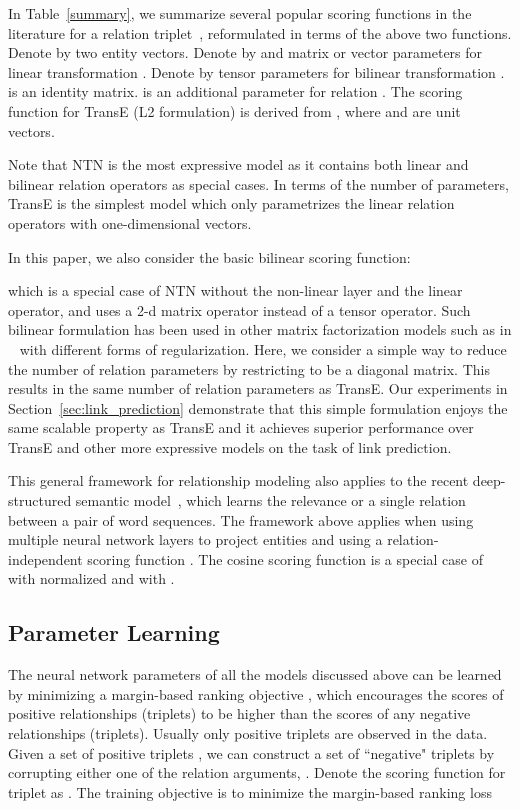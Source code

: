 \documentclass{article} \usepackage{iclr2015,times}
\begin{document}
In Table~\ref{summary}, we summarize several popular scoring functions in the literature for a relation triplet~, reformulated in terms of the above two functions. Denote by  two entity vectors. 
Denote by  and  matrix or vector parameters for linear transformation  . 
Denote by  tensor parameters for bilinear transformation .  is an identity matrix.  is an additional parameter for relation . The scoring function for TransE (L2 formulation) is derived from , where  and  are unit vectors. 

Note that NTN is the most expressive model as it contains both linear and bilinear relation operators as special cases. In terms of the number of parameters, TransE is the simplest model which only parametrizes the linear relation operators with one-dimensional vectors. 

In this paper, we also consider the basic bilinear scoring function:
 
which is a special case of NTN without the non-linear layer and the linear operator, and uses a 2-d matrix operator  instead of a tensor operator. Such bilinear formulation has been used in other matrix factorization models such as in ~\citep{NickelTrKr11,jenatton2012latent,garcia2014effective} with different forms of regularization. Here, we consider a simple way to reduce the number of relation parameters by restricting  to be a diagonal matrix. This results in the same number of relation parameters as TransE. Our experiments in Section~\ref{sec:link_prediction} demonstrate that this simple formulation enjoys the same scalable property as TransE and it achieves superior performance over TransE and other more expressive models on the task of link prediction.

This general framework for relationship modeling also applies to the recent deep-structured semantic model~\citep{Huang-2013,Shen-2014,shen2014learning,Gao-2014,yihsemantic}, which learns the relevance or a single relation between a pair of word sequences. The framework above applies when using multiple neural network layers to project entities and using a relation-independent scoring function . The cosine scoring function is a special case of  with normalized  and with .

\subsection{Parameter Learning}
The neural network parameters of all the models discussed above can be learned by minimizing a margin-based ranking objective
, which encourages the scores of positive relationships (triplets) to be higher than the scores of any negative relationships (triplets). Usually only positive triplets are observed in the data. Given a set of positive triplets , we can construct a set of ``negative" triplets  by corrupting either one of the relation arguments, . Denote the scoring function for triplet  as . The training objective is to minimize the margin-based ranking loss
\end{document}
